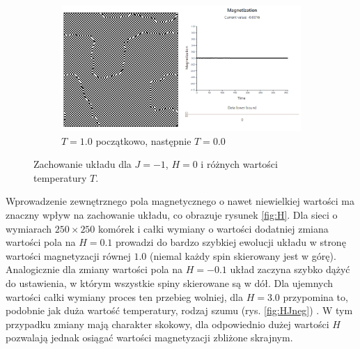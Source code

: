 \documentclass[11pt] {article}
\begin{document}
\begin{figure}[H]
\begin{subfigure}{.5\textwidth}
  \centering
  \includegraphics[width=0.9\linewidth]{res/T_0_negative.png}
  \caption{$T = 1.0$ początkowo, następnie $T = 0.0$}
  \label{fig:TJN0}
\end{subfigure}
\caption{Zachowanie układu dla $J = -1$, $H = 0$ i różnych wartości temperatury $T$.}
\label{fig:TJN}
\end{figure}

\newpage
Wprowadzenie zewnętrznego pola magnetycznego o nawet niewielkiej wartości ma znaczny wpływ na zachowanie układu, co obrazuje rysunek \ref{fig:H}. Dla sieci o wymiarach $250 \times 250$ komórek i całki wymiany o wartości dodatniej zmiana wartości pola na $H = 0.1$ prowadzi do bardzo szybkiej ewolucji układu w stronę wartości magnetyzacji równej $1.0$ (niemal każdy spin skierowany jest w górę). Analogicznie dla zmiany wartości pola na $H = -0.1$ układ zaczyna szybko dążyć do ustawienia, w którym wszystkie spiny skierowane są w dół. Dla ujemnych wartości całki wymiany proces ten przebieg wolniej, dla $H=3.0$ przypomina to, podobnie jak duża wartość temperatury, rodzaj szumu (rys. \ref{fig:HJneg}) . W tym przypadku zmiany mają charakter skokowy, dla odpowiednio dużej wartości $H$ pozwalają jednak osiągać wartości magnetyzacji zbliżone skrajnym.
\end{document}
